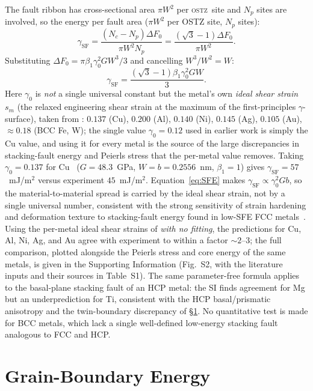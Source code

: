 \documentclass[3p]{elsarticle}
\newcommand{\OSTZ}{\textsc{ostz}}
\newcommand{\dF}{\Delta F_0}
\newcommand{\gz}{\gamma_0}
\begin{document}
The fault ribbon has cross-sectional area $\pi W^2$ per \OSTZ\ site
and $N_p$ sites are involved, so the energy per fault area
($\pi W^2$ per OSTZ site, $N_p$ sites):
\[
  \gamma_\text{SF}=\frac{(N_c-N_p)\dF}{\pi W^2 N_p}
  =\frac{(\sqrt3-1)\dF}{\pi W^2}.
\]
Substituting $\dF=\pi\beta_1\gz^2GW^3/3$ and cancelling
$W^3/W^2=W$:
\begin{equation}
  \boxed{\gamma_\text{SF}=\frac{(\sqrt3-1)\beta_1\gz^2GW}{3}.}
  \label{eq:SFE}
\end{equation}
Here $\gz$ is \emph{not} a single universal constant but the metal's
own \emph{ideal shear strain} $s_m$ (the relaxed engineering shear
strain at the maximum of the first-principles $\gamma$-surface), taken
from \citet{ogata2004}: $0.137$ (Cu), $0.200$ (Al), $0.140$ (Ni),
$0.145$ (Ag), $0.105$ (Au), $\approx0.18$ (BCC Fe, W); the single value
$\gz=0.12$ used in earlier work is simply the Cu value, and using it
for every metal is the source of the large discrepancies in
stacking-fault energy and Peierls stress that the per-metal value
removes. Taking $\gz=0.137$ for Cu~\citep{ogata2004} ($G=48.3$~GPa,
$W=b=0.2556$~nm, $\beta_1=1$) gives $\gamma_\text{SF}=57$~mJ/m$^2$
versus experiment $45$~mJ/m$^2$. Equation~\eqref{eq:SFE} makes
$\gamma_\text{SF}\propto\gz^2Gb$, so the material-to-material spread is
carried by the ideal shear strain, not by a single universal number,
consistent with the strong sensitivity of strain hardening and
deformation texture to stacking-fault energy found in low-SFE
FCC metals~\citep{kalidindi2001,you2023sfe}.
Using the per-metal ideal shear strains of \citet{ogata2004}
\emph{with no fitting}, the predictions for Cu, Al, Ni, Ag, and Au agree
with experiment to within a factor $\sim2$--$3$; the full comparison,
plotted alongside the Peierls stress and core energy of the same metals,
is given in the Supporting Information (Fig.~S2, with the literature
inputs and their sources in Table~S1). The same parameter-free formula
applies to the basal-plane stacking fault of an HCP metal: the SI finds
agreement for Mg but an underprediction for Ti, consistent with the HCP
basal/prismatic anisotropy and the twin-boundary discrepancy of
\S\ref{sec:gb}. No quantitative test is made for BCC metals, which lack a
single well-defined low-energy stacking fault analogous to FCC and HCP.

\section{Grain-Boundary Energy}
\label{sec:gb}
\end{document}
